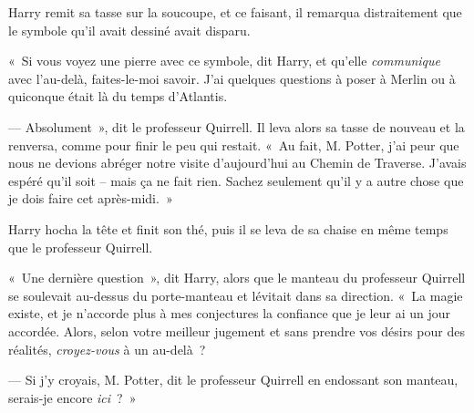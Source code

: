Harry remit sa tasse sur la soucoupe, et ce faisant, il remarqua distraitement que le symbole qu'il avait dessiné avait disparu.

«~Si vous voyez une pierre avec ce symbole, dit Harry, et qu'elle \emph{communique} avec l'au-delà, faites-le-moi savoir.
J'ai quelques questions à poser à Merlin ou à quiconque était là du temps d'Atlantis.

--- Absolument~», dit le professeur Quirrell.
Il leva alors sa tasse de nouveau et la renversa, comme pour finir le peu qui restait.
«~Au fait, M. Potter, j'ai peur que nous ne devions abréger notre visite d'aujourd'hui au Chemin de Traverse.
J'avais espéré qu'il soit -- mais ça ne fait rien.
Sachez seulement qu'il y a autre chose que je dois faire cet après-midi.~»

Harry hocha la tête et finit son thé, puis il se leva de sa chaise en même temps que le professeur Quirrell.

«~Une dernière question~», dit Harry, alors que le manteau du professeur Quirrell se soulevait au-dessus du porte-manteau et lévitait dans sa direction.
«~La magie existe, et je n'accorde plus à mes conjectures la confiance que je leur ai un jour accordée.
Alors, selon votre meilleur jugement et sans prendre vos désirs pour des réalités, \emph{croyez-vous} à un au-delà~?

--- Si j'y croyais, M. Potter, dit le professeur Quirrell en endossant son manteau, serais-je encore \emph{ici}~?~»

